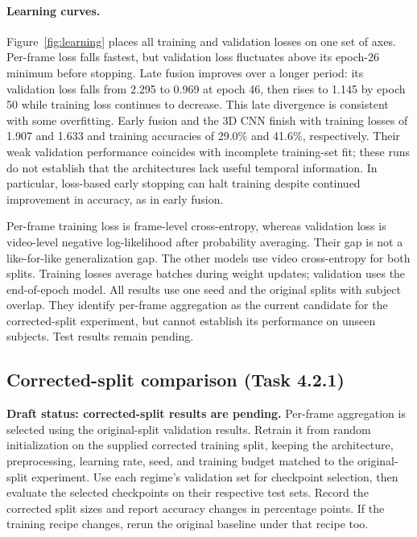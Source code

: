 \paragraph{Learning curves.}
Figure~\ref{fig:learning} places all training and validation losses on one
set of axes. Per-frame loss falls fastest, but validation loss fluctuates
above its epoch-26 minimum before stopping. Late fusion improves over a
longer period: its validation loss falls from 2.295 to 0.969 at epoch 46,
then rises to 1.145 by epoch 50 while training loss continues to decrease.
This late divergence is consistent with some overfitting. Early fusion and
the 3D CNN finish with training losses of 1.907 and 1.633 and training
accuracies of 29.0\% and 41.6\%, respectively. Their weak validation
performance coincides with incomplete training-set fit; these runs do not
establish that the architectures lack useful temporal information. In
particular, loss-based early stopping can halt training despite continued
improvement in accuracy, as in early fusion.

Per-frame training loss is frame-level cross-entropy, whereas validation
loss is video-level negative log-likelihood after probability averaging.
Their gap is not a like-for-like generalization gap. The other models use
video cross-entropy for both splits. Training losses average batches during
weight updates; validation uses the end-of-epoch model. All results use one
seed and the original splits with subject overlap. They identify per-frame
aggregation as the current candidate for the corrected-split experiment,
but cannot establish its performance on unseen subjects. Test results
remain pending.

\subsection{Corrected-split comparison (Task 4.2.1)}
\label{sec:corrected}
\textbf{Draft status: corrected-split results are pending.}
Per-frame aggregation is selected using the original-split validation
results. Retrain it from random initialization
on the supplied corrected training split, keeping the architecture,
preprocessing, learning rate, seed, and training budget matched to the
original-split experiment. Use each regime's validation set for checkpoint
selection, then evaluate the selected checkpoints on their respective test
sets. Record the corrected split sizes and report accuracy changes in
percentage points. If the training recipe changes, rerun the original
baseline under that recipe too.

